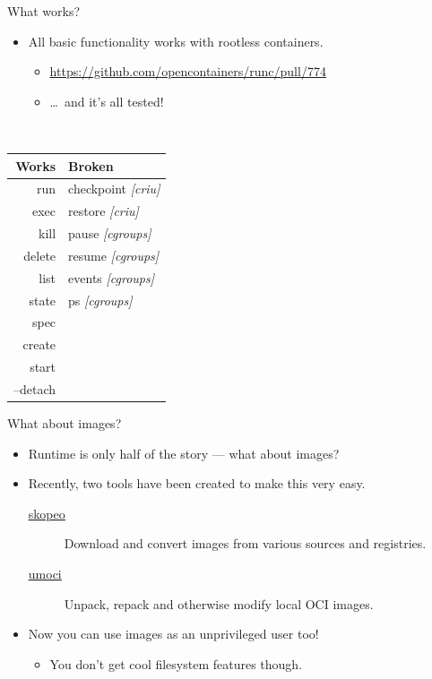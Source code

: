 \documentclass[10pt,aspectratio=169]{beamer}
\begin{document}
	\begin{frame}{What works?}
		\begin{itemize}
			\item All basic functionality works with rootless containers.
			\begin{itemize}
				\item \underline{\url{https://github.com/opencontainers/runc/pull/774}}
				\item \dots~and it's all tested!
			\end{itemize}
		\end{itemize}

		\vfill

		\begin{center}
			\tt
			\begin{tabular}{rl}
				\textnormal{Works} & \textnormal{Broken} \\
				\toprule
				run & checkpoint \textit{\textnormal{[criu]}}\\
				exec & restore \textit{\textnormal{[criu]}} \\
				kill & pause \textit{\textnormal{[cgroups]}} \\
				delete & resume \textit{\textnormal{[cgroups]}} \\
				list & events \textit{\textnormal{[cgroups]}} \\
				state & ps \textit{\textnormal{[cgroups]}} \\
				spec & \\
				create & \\
				start & \\
				--detach & \\
			\end{tabular}
		\end{center}
	\end{frame}

	\begin{frame}{What about images?}
		\begin{itemize}
			\item Runtime is only half of the story --- what about images?
			\item Recently, two tools have been created to make this very easy.
			\begin{description}
				\item[\href{https://github.com/projectatomic/skopeo}{\underline{skopeo}}] Download and convert images from various sources and registries.
				\item[\href{https://github.com/cyphar/umoci}{\underline{umoci}}] Unpack, repack and otherwise modify local OCI images.
			\end{description}
			\item Now you can use images as an unprivileged user too!
			\begin{itemize}
				\item You don't get cool filesystem features though.
			\end{itemize}
		\end{itemize}
	\end{frame}
\end{document}
